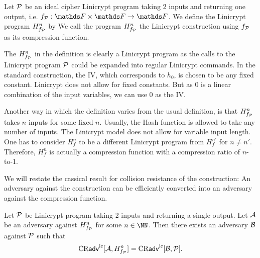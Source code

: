 \begin{defn}
    Let $\P$ be an ideal cipher Linicrypt program taking 2 inputs and returning one output, i.e. $f_\P: \F \times \F \to \F$.
    We define the Linicrypt program $H^n_{f_\P}$ by
    We call the program $\PMD{f_\P}$ the Linicrypt \MD construction using $f_\P$ as its compression function.
\end{defn}

The $\PMD{f_\P}$ in the definition is clearly a Linicrypt program as the calls to the Linicrypt program $\P$ could be expanded into regular Linicrypt commands.
In the standard \MD construction, the IV, which corresponds to $h_0$, is chosen to be any fixed constant.
Linicrypt does not allow for fixed constants.
But as 0 is a linear combination of the input variables, we can use 0 as the IV.

Another way in which the definition varies from the usual definition,
is that $\PMD{f_\P}$ takes $n$ inputs for some fixed $n$.
Usually, the \MD Hash function is allowed to take any number of inputs.
The Linicrypt model does not allow for variable input length.
One has to consider $H^n_f$ to be a different Linicrypt program from $H^{n'}_f$ for $n \neq n'$.
Therefore, $H^n_f$ is actually a compression function with a compression ratio of $n$-to-1.

We will restate the cassical result for collision resistance of the \MD construction:
An adversary against the \MD construction can be efficiently converted into an adversary against the compression function.

\begin{thm}
    Let $\P$ be Linicrypt program taking 2 inputs and returning a single output.
    Let $\A$ be an adversary against $\PMD{f_\P}$ for some $n \in \NN$.
    Then there exists an adversary $\advB$ against $\P$ such that
    \[
        \cradv{\A, \PMD{f_\P}} = \cradv{\advB, \P}.
    \]
\end{thm}

